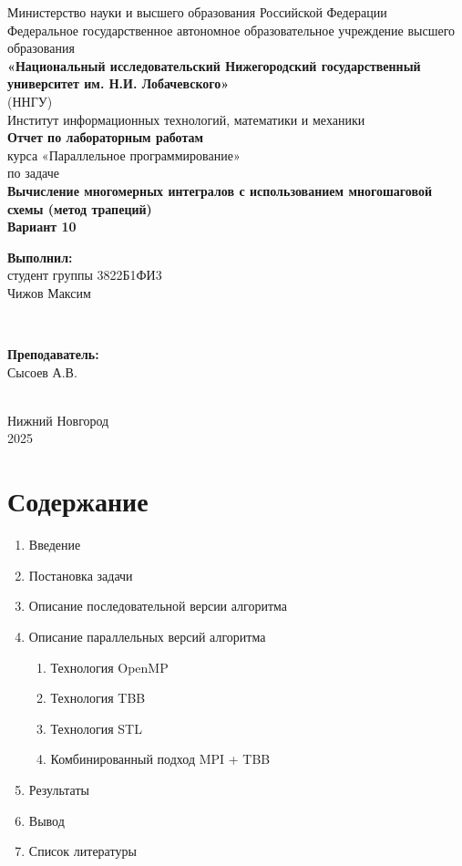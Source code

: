 \documentclass[a4paper,14pt]{article}
\begin{document}
\begin{titlepage}
    \centering
    \large
    Министерство науки и высшего образования Российской Федерации\\[0.5cm]
    Федеральное государственное автономное образовательное учреждение высшего образования\\[0.5cm]
    \textbf{«Национальный исследовательский Нижегородский государственный университет им. Н.И. Лобачевского»}\\
    (ННГУ)\\[1cm]
    Институт информационных технологий, математики и механики\\[0.5cm]

    \vfill
    {\LARGE \textbf{Отчет по лабораторным работам }}\\[0.5cm]
    {\Large курса «Параллельное программирование» }\\[0.5cm]
    {\Large по задаче}\\[0.5cm]
    {\LARGE \textbf{Вычисление многомерных интегралов с использованием многошаговой схемы (метод трапеций)}}\\[0.5cm]
    {\Large \textbf{Вариант 10}}\\[2.5cm]

    \hfill\parbox{0.5\textwidth}{
        \textbf{Выполнил:} \\
        студент группы 3822Б1ФИ3 \\
        Чижов Максим
    }\\[0.5cm]

    \hfill\parbox{0.5\textwidth}{
        \textbf{Преподаватель:} \\
        Сысоев А.В.

    }\\[2cm]

    \vfill
    { Нижний Новгород } \\
    { 2025 }
\end{titlepage}

\newpage
\section*{Содержание}

\begin{enumerate}
    \item Введение
    \item Постановка задачи
    \item Описание последовательной версии алгоритма
    \item Описание параллельных версий алгоритма
    \begin{enumerate}
        \item Технология OpenMP
        \item Технология TBB
        \item Технология STL
        \item Комбинированный подход MPI + TBB
    \end{enumerate}
    \item Результаты
    \item Вывод
    \item Список литературы
\end{enumerate}
\end{document}
